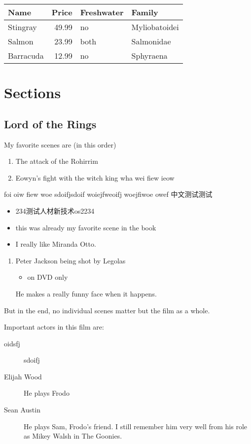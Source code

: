 \documentclass[UTF8,nofonts]{ctexart}
\begin{document}
\begin{center}
\begin{tabular}{lrll}
Name & Price & Freshwater & Family\\
\hline
Stingray & 49.99 & no & Myliobatoidei\\
Salmon & 23.99 & both & Salmonidae\\
Barracuda & 12.99 & no & Sphyraena\\
\end{tabular}
\end{center}

\section{Sections}
\label{sec:orgheadline12}

\subsection{Lord of the Rings}
\label{sec:orgheadline11}

My favorite scenes are (in this order)

\begin{enumerate}
\item The attack of the Rohirrim
\item Eowyn's fight with the witch king
wha wei fiew ieow
\end{enumerate}

foi oiw fiew woe
sdoifjsdoif woiejfweoifj woejfiwoe owef
中文测试测试

\begin{itemize}
\item 234测试人材新技术os2234
\item this was already my favorite scene in the book
\item I really like Miranda Otto.
\end{itemize}
\begin{enumerate}
\item Peter Jackson being shot by Legolas
\begin{itemize}
\item on DVD only
\end{itemize}
He makes a really funny face when it happens.
\end{enumerate}

But in the end, no individual scenes matter but the film as a whole.

Important actors in this film are:

\begin{description}
\item[{oidsfj}] sdoifj

\item[{Elijah Wood}] He plays Frodo
\item[{Sean Austin}] He plays Sam, Frodo's friend.  I still remember
him very well from his role as Mikey Walsh in The Goonies.
\end{description}
\end{document}
